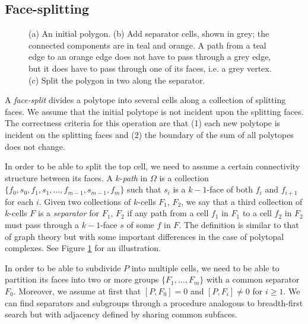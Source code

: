 \documentclass[twocolumn]{article}
\begin{document}
\subsection{Face-splitting}

\begin{figure}[t]
    \begin{center}
        
    \end{center}
    \caption{(a) An initial polygon.
    (b) Add separator cells, shown in grey; the connected components are in teal and orange.
    A path from a teal edge to an orange edge does not have to pass through a grey edge, but it does have to pass through one of its faces, i.e. a grey vertex.
    (c) Split the polygon in two along the separator.}
    \label{fig:separator}
\end{figure}

A \emph{face-split} divides a polytope into several cells along a collection of splitting faces.
We assume that the initial polytope is not incident upon the splitting faces.
The correctness criteria for this operation are that (1) each new polytope is incident on the splitting faces and (2) the boundary of the sum of all polytopes does not change.

In order to be able to split the top cell, we need to assume a certain connectivity structure between its faces.
A $k$-\emph{path} in $\Omega$ is a collection $\{f_0, s_0, f_1, s_1, \ldots, f_{m - 1}, s_{m - 1}, f_m\}$ such that $s_i$ is a $k - 1$-face of both $f_i$ and $f_{i + 1}$ for each $i$.
Given two collections of $k$-cells $F_1$, $F_2$, we say that a third collection of $k$-cells $F$ is a \emph{separator} for $F_1$, $F_2$ if any path from a cell $f_1$ in $F_1$ to a cell $f_2$ in $F_2$ must pass through a $k - 1$-face $s$ of some $f$ in $F$.
The definition is similar to that of graph theory but with some important differences in the case of polytopal complexes.
See Figure \ref{fig:separator} for an illustration.

In order to be able to subdivide $P$ into multiple cells, we need to be able to partition its faces into two or more groups $\{F_1, \ldots, F_m\}$ with a common separator $F_0$.
Moreover, we assume at first that $[P, F_0] = 0$ and $[P, F_i] \neq 0$ for $i \ge 1$.
We can find separators and subgroups through a procedure analogous to breadth-first search but with adjacency defined by sharing common subfaces.
\end{document}
